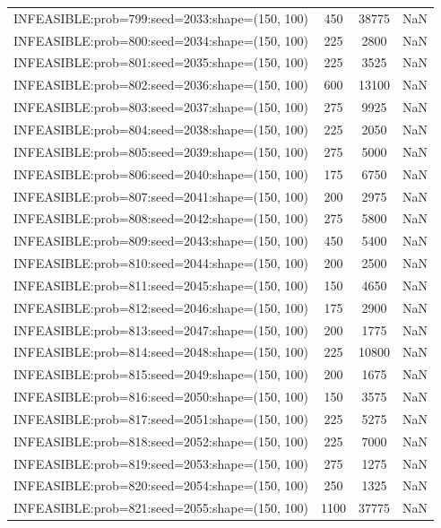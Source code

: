 \begin{longtable}{lccc}
INFEASIBLE:prob=799:seed=2033:shape=(150, 100) &      450 & 38775 &    NaN \\
INFEASIBLE:prob=800:seed=2034:shape=(150, 100) &      225 &  2800 &    NaN \\
INFEASIBLE:prob=801:seed=2035:shape=(150, 100) &      225 &  3525 &    NaN \\
INFEASIBLE:prob=802:seed=2036:shape=(150, 100) &      600 & 13100 &    NaN \\
INFEASIBLE:prob=803:seed=2037:shape=(150, 100) &      275 &  9925 &    NaN \\
INFEASIBLE:prob=804:seed=2038:shape=(150, 100) &      225 &  2050 &    NaN \\
INFEASIBLE:prob=805:seed=2039:shape=(150, 100) &      275 &  5000 &    NaN \\
INFEASIBLE:prob=806:seed=2040:shape=(150, 100) &      175 &  6750 &    NaN \\
INFEASIBLE:prob=807:seed=2041:shape=(150, 100) &      200 &  2975 &    NaN \\
INFEASIBLE:prob=808:seed=2042:shape=(150, 100) &      275 &  5800 &    NaN \\
INFEASIBLE:prob=809:seed=2043:shape=(150, 100) &      450 &  5400 &    NaN \\
INFEASIBLE:prob=810:seed=2044:shape=(150, 100) &      200 &  2500 &    NaN \\
INFEASIBLE:prob=811:seed=2045:shape=(150, 100) &      150 &  4650 &    NaN \\
INFEASIBLE:prob=812:seed=2046:shape=(150, 100) &      175 &  2900 &    NaN \\
INFEASIBLE:prob=813:seed=2047:shape=(150, 100) &      200 &  1775 &    NaN \\
INFEASIBLE:prob=814:seed=2048:shape=(150, 100) &      225 & 10800 &    NaN \\
INFEASIBLE:prob=815:seed=2049:shape=(150, 100) &      200 &  1675 &    NaN \\
INFEASIBLE:prob=816:seed=2050:shape=(150, 100) &      150 &  3575 &    NaN \\
INFEASIBLE:prob=817:seed=2051:shape=(150, 100) &      225 &  5275 &    NaN \\
INFEASIBLE:prob=818:seed=2052:shape=(150, 100) &      225 &  7000 &    NaN \\
INFEASIBLE:prob=819:seed=2053:shape=(150, 100) &      275 &  1275 &    NaN \\
INFEASIBLE:prob=820:seed=2054:shape=(150, 100) &      250 &  1325 &    NaN \\
INFEASIBLE:prob=821:seed=2055:shape=(150, 100) &     1100 & 37775 &    NaN \\

\end{longtable}
